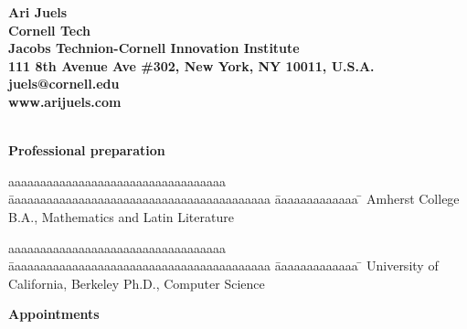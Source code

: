 \documentclass[11pt]{article}
\begin{document}
\begin{center} \bf{ \Large{Ari Juels}}\\ 
\vspace{2mm}
Cornell Tech\\
Jacobs Technion-Cornell Innovation Institute\\
111 8th Avenue Ave \#302, New York, NY 10011, U.S.A.\\
juels@cornell.edu\\
www.arijuels.com
\end{center}


\noindent\hrulefill
\\

\noindent 
{\Large {\bf Professional preparation}}

\vspace{-1mm}
\begin{tabbing}
aaaaaaaaaaaaaaaaaaaaaaaaaaaaaaaaaa \= aaaaaaaaaaaaaaaaaaaaaaaaaaaaaaaaaaaaaaaaa \= aaaaaaaaaaaaa \= \kill
Amherst College \> B.A., Mathematics and Latin Literature  
\end{tabbing}
\vspace{-8mm}
\begin{tabbing}
aaaaaaaaaaaaaaaaaaaaaaaaaaaaaaaaaa \= aaaaaaaaaaaaaaaaaaaaaaaaaaaaaaaaaaaaaaaaa \= aaaaaaaaaaaaa \= \kill
University of California, Berkeley \> Ph.D., Computer Science 
\end{tabbing}

\bigskip

\noindent 
{\Large {\bf Appointments}}
\end{document}
